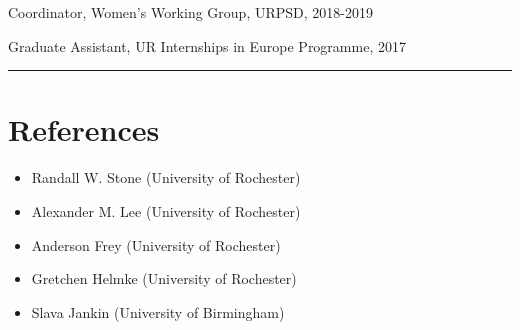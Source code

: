 \documentclass[margin,line,10.95pt]{res}
\begin{document}
\begin{resume}
Coordinator, Women's Working Group,  URPSD,  2018-2019
\vspace*{-4.5mm}

Graduate Assistant, UR Internships in Europe Programme,  2017

\begin{center}
	\noindent\rule{8cm}{0.4pt}
\end{center}
\vspace{0.5em}

\section{\sc References}
\begin{itemize}
	\item Randall W. Stone (University of Rochester)
	\item Alexander M. Lee (University of Rochester)
	\item Anderson Frey (University of Rochester)
	\item Gretchen Helmke (University of Rochester) 
	\item Slava Jankin (University of Birmingham)




\end{itemize}
\end{resume}
\end{document}
